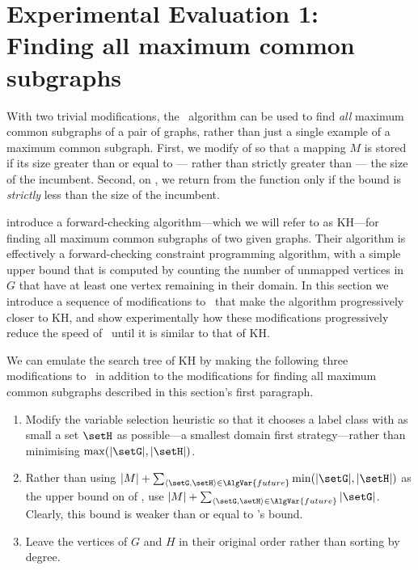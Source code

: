 \section{Experimental Evaluation 1: Finding all maximum common subgraphs}
\label{sec:mcsplit-finding-all}

With two trivial modifications, the \McSplit\ algorithm can be used to find
\emph{all} maximum common subgraphs of a pair of graphs, rather than just a single
example of a maximum common subgraph.
First, we modify  of  so that
a mapping $M$ is stored if its size greater than or equal to --- rather than
strictly greater than --- the size of the incumbent.  Second, on ,
we return from the function only if the bound is \emph{strictly} less than the
size of the incumbent.

\citet{DBLP:journals/spe/KrissinelH04} introduce a forward-checking
algorithm---which we will refer to as KH---for finding all maximum common
subgraphs of two given graphs.  Their algorithm is effectively a
forward-checking constraint programming algorithm, with a simple upper bound
that is computed by counting the number of unmapped vertices in $G$ that have
at least one vertex remaining in their domain.  In this section we
introduce a sequence of modifications to \McSplit\ that make the algorithm
progressively closer to KH, and show experimentally how these modifications
progressively reduce the speed of \McSplit\ until it is similar to that of KH.

We can emulate the search tree of KH
by making the following three modifications to \McSplit\ in addition to the modifications for
finding all maximum common subgraphs described in this section's first paragraph.

\begin{enumerate}
    \item Modify the variable selection heuristic so that it chooses a label class with
as small a set $\setH$ as possible---a smallest domain first strategy---rather than minimising $\max(|\setG|,|\setH|)$.
    \item Rather 
than using $|M|  + \sum_{\langle \setG,\setH \rangle \in \AlgVar{future}} \min(|\setG|,|\setH|)$
as the upper bound on  of ,
use $|M|  + \sum_{\langle \setG,\setH \rangle \in \AlgVar{future}} |\setG|$.  Clearly,
this bound is weaker than or equal to \McSplit's bound.
    \item Leave the vertices of $G$ and $H$ in their original order rather than sorting
        by degree.
\end{enumerate}


